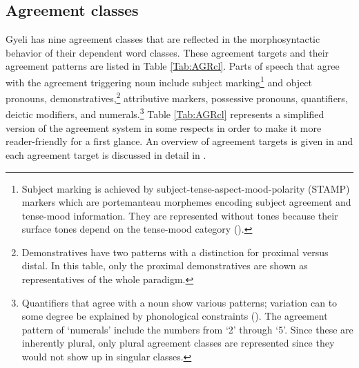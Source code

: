 

\subsection{Agreement classes}
\label{sec:AGR}

Gyeli has nine agreement classes that are reflected in the morphosyntactic behavior of their dependent word classes. These agreement targets and their agreement patterns are listed in Table \ref{Tab:AGRcl}.  Parts of speech that agree with the agreement triggering noun include subject marking\footnote{Subject marking is achieved by subject-tense-aspect-mood-polarity (STAMP) markers which are portemanteau morphemes encoding subject agreement and tense-mood information. They are represented without tones because their surface tones depend on the tense-mood category ().} and object pronouns, demonstratives,\footnote{Demonstratives have two patterns with a distinction for proximal versus distal. In this table, only the proximal demonstratives are shown as representatives of the whole paradigm.} attributive markers, possessive pronouns, quantifiers, deictic modifiers, and numerals.\footnote{Quantifiers that agree with a noun show various patterns; variation can to some degree be explained by phonological constraints (). The agreement pattern of `numerals' include the numbers from `2' through `5'. Since these are inherently plural, only plural agreement classes are represented since they would not show up in singular classes.} Table \ref{Tab:AGRcl} represents a simplified version of the agreement system in some respects in order to make it more reader-friendly for a first glance. An overview of agreement targets is given in  and each agreement target is discussed in detail in .


